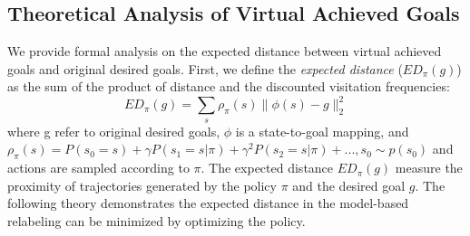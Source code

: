 \documentclass{article}
\begin{document}
\subsection{Theoretical Analysis of Virtual Achieved Goals}
\label{ap:theorem_goals}

We provide formal analysis on the expected distance between virtual achieved goals and original desired goals. First, we define the \emph{expected distance} ($ED_{\pi}(g)$) as the sum of the product of distance and the discounted visitation frequencies:
\begin{equation*}
    ED_{\pi}(g) = \sum_s \rho_\pi(s) \|\phi(s)-g\|_2^2
\end{equation*}
where g refer to original desired goals, $\phi$ is a state-to-goal mapping, and $\rho_\pi(s)=P(s_0=s)+\gamma P(s_1 = s|\pi)+\gamma^2 P(s_2 = s|\pi)+..., s_0\sim p(s_0)$ and actions are sampled according to $\pi$. The expected distance $ED_{\pi}(g)$ measure the proximity of trajectories generated by the policy $\pi$ and the desired goal $g$. The following theory demonstrates the expected distance in the model-based relabeling can be minimized by optimizing the policy.
\end{document}
